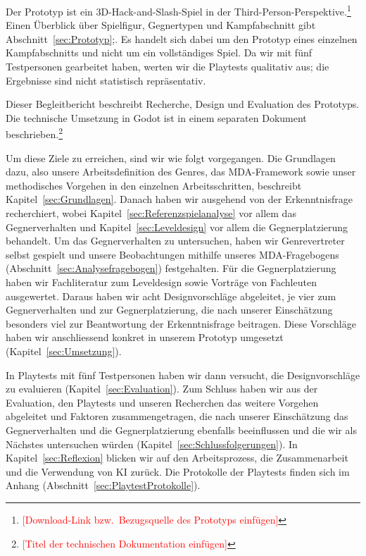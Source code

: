 \documentclass[../Main.tex]{subfiles}
\begin{document}
Der Prototyp ist ein 3D-Hack-and-Slash-Spiel in der Third-Person-Perspektive.\footnote{\textcolor{red}{[Download-Link bzw.\ Bezugsquelle des Prototyps einfügen]}} Einen Überblick über Spielfigur, Gegnertypen und Kampfabschnitt gibt Abschnitt~\ref{sec:Prototyp};. Es handelt sich dabei um den Prototyp eines einzelnen Kampfabschnitts und nicht um ein vollständiges Spiel. Da wir mit fünf Testpersonen gearbeitet haben, werten wir die Playtests qualitativ aus; die Ergebnisse sind nicht statistisch repräsentativ.

Dieser Begleitbericht beschreibt Recherche, Design und Evaluation des Prototyps. Die technische Umsetzung in Godot ist in einem separaten Dokument beschrieben.\footnote{\textcolor{red}{[Titel der technischen Dokumentation einfügen]}}

Um diese Ziele zu erreichen, sind wir wie folgt vorgegangen. Die Grundlagen dazu, also unsere Arbeitsdefinition des Genres, das MDA-Framework sowie unser methodisches Vorgehen in den einzelnen Arbeitsschritten, beschreibt Kapitel~\ref{sec:Grundlagen}. Danach haben wir ausgehend von der Erkenntnisfrage recherchiert, wobei Kapitel~\ref{sec:Referenzspielanalyse} vor allem das Gegnerverhalten und Kapitel~\ref{sec:Leveldesign} vor allem die Gegnerplatzierung behandelt. Um das Gegnerverhalten zu untersuchen, haben wir Genrevertreter selbst gespielt und unsere Beobachtungen mithilfe unseres MDA-Fragebogens (Abschnitt~\ref{sec:Analysefragebogen}) festgehalten. Für die Gegnerplatzierung haben wir Fachliteratur zum Leveldesign\autocite{totten2014architectural,rogers2014levelup} sowie Vorträge von Fachleuten ausgewertet. Daraus haben wir acht Designvorschläge abgeleitet, je vier zum Gegnerverhalten und zur Gegnerplatzierung, die nach unserer Einschätzung besonders viel zur Beantwortung der Erkenntnisfrage beitragen. Diese Vorschläge haben wir anschliessend konkret in unserem Prototyp umgesetzt (Kapitel~\ref{sec:Umsetzung}).

In Playtests mit fünf Testpersonen haben wir dann versucht, die Designvorschläge zu evaluieren (Kapitel~\ref{sec:Evaluation}). Zum Schluss haben wir aus der Evaluation, den Playtests und unseren Recherchen das weitere Vorgehen abgeleitet und Faktoren zusammengetragen, die nach unserer Einschätzung das Gegnerverhalten und die Gegnerplatzierung ebenfalls beeinflussen und die wir als Nächstes untersuchen würden (Kapitel~\ref{sec:Schlussfolgerungen}). In Kapitel~\ref{sec:Reflexion} blicken wir auf den Arbeitsprozess, die Zusammenarbeit und die Verwendung von KI zurück. Die Protokolle der Playtests finden sich im Anhang (Abschnitt~\ref{sec:PlaytestProtokolle}).

\newpage
\end{document}
